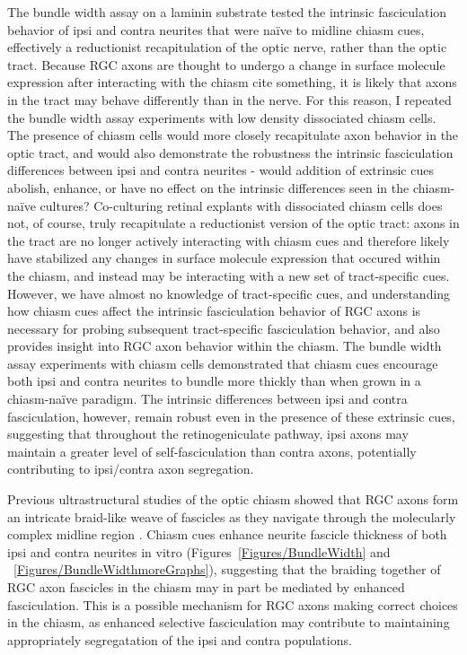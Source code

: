 The bundle width assay on a laminin substrate tested the intrinsic fasciculation behavior of ipsi and contra neurites that were na\"ive to midline chiasm cues, effectively a reductionist recapitulation of the optic nerve, rather than the optic tract.
Because RGC axons are thought to undergo a change in surface molecule expression after interacting with the chiasm {cite something}, it is likely that axons in the tract may behave differently than in the nerve.
For this reason, I repeated the bundle width assay experiments with low density dissociated chiasm cells.
The presence of chiasm cells would more closely recapitulate axon behavior in the optic tract, and would also demonstrate the robustness the intrinsic fasciculation differences between ipsi and contra neurites - would addition of extrinsic cues abolish, enhance, or have no effect on the intrinsic differences seen in the chiasm-na\"ive cultures?
Co-culturing retinal explants with dissociated chiasm cells does not, of course, truly recapitulate a reductionist version of the optic tract: axons in the tract are no longer actively interacting with chiasm cues and therefore likely have stabilized any changes in surface molecule expression that occured within the chiasm, and instead may be interacting with a new set of tract-specific cues.
However, we have almost no knowledge of tract-specific cues, and understanding how chiasm cues affect the intrinsic fasciculation behavior of RGC axons is necessary for probing subsequent tract-specific fasciculation behavior, and also provides insight into RGC axon behavior within the chiasm.
The bundle width assay experiments with chiasm cells demonstrated that chiasm cues encourage both ipsi and contra neurites to bundle more thickly than when grown in a chiasm-na\"ive paradigm.
The intrinsic differences between ipsi and contra fasciculation, however, remain robust even in the presence of these extrinsic cues, suggesting that throughout the retinogeniculate pathway, ipsi axons may maintain a greater level of self-fasciculation than contra axons, potentially contributing to ipsi/contra axon segregation.

Previous ultrastructural studies of the optic chiasm showed that RGC axons form an intricate braid-like weave of fascicles as they navigate through the molecularly complex midline region \cite{colello1998changing}.
Chiasm cues enhance neurite fascicle thickness of both ipsi and contra neurites in vitro (Figures~\ref{Figures/BundleWidth} and ~\ref{Figures/BundleWidthmoreGraphs}), suggesting that the braiding together of RGC axon fascicles in the chiasm may in part be mediated by enhanced fasciculation.
This is a possible mechanism for RGC axons making correct choices in the chiasm, as enhanced selective fasciculation may contribute to maintaining appropriately segregatation of the ipsi and contra populations.


